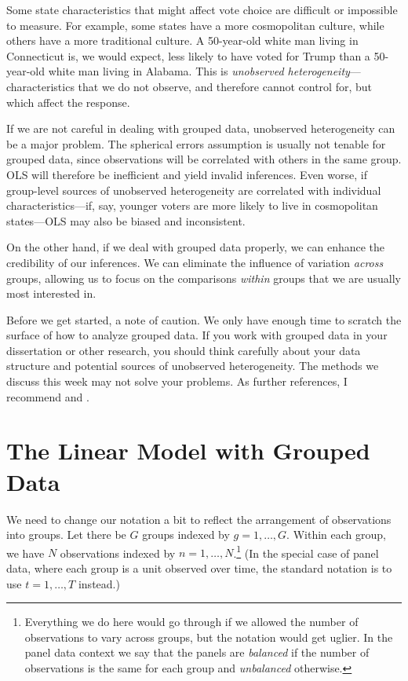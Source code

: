 \documentclass[
  12pt,
  oneside,openany]{book}
\begin{document}
Some state characteristics that might affect vote choice are difficult or impossible to measure. For example, some states have a more cosmopolitan culture, while others have a more traditional culture. A 50-year-old white man living in Connecticut is, we would expect, less likely to have voted for Trump than a 50-year-old white man living in Alabama. This is \emph{unobserved heterogeneity}---characteristics that we do not observe, and therefore cannot control for, but which affect the response.

If we are not careful in dealing with grouped data, unobserved heterogeneity can be a major problem. The spherical errors assumption is usually not tenable for grouped data, since observations will be correlated with others in the same group. OLS will therefore be inefficient and yield invalid inferences. Even worse, if group-level sources of unobserved heterogeneity are correlated with individual characteristics---if, say, younger voters are more likely to live in cosmopolitan states---OLS may also be biased and inconsistent.

On the other hand, if we deal with grouped data properly, we can enhance the credibility of our inferences. We can eliminate the influence of variation \emph{across} groups, allowing us to focus on the comparisons \emph{within} groups that we are usually most interested in.

Before we get started, a note of caution. We only have enough time to scratch the surface of how to analyze grouped data. If you work with grouped data in your dissertation or other research, you should think carefully about your data structure and potential sources of unobserved heterogeneity. The methods we discuss this week may not solve your problems. As further references, I recommend \citet{Wooldridge:2002vr} and \citet{gelman2006data}.

\hypertarget{the-linear-model-with-grouped-data}{%
\section{The Linear Model with Grouped Data}\label{the-linear-model-with-grouped-data}}

We need to change our notation a bit to reflect the arrangement of observations into groups. Let there be \(G\) groups indexed by \(g = 1, \ldots, G\). Within each group, we have \(N\) observations indexed by \(n = 1, \ldots, N\).\footnote{Everything we do here would go through if we allowed the number of observations to vary across groups, but the notation would get uglier. In the panel data context we say that the panels are \emph{balanced} if the number of observations is the same for each group and \emph{unbalanced} otherwise.} (In the special case of panel data, where each group is a unit observed over time, the standard notation is to use \(t = 1, \ldots, T\) instead.)
\end{document}
